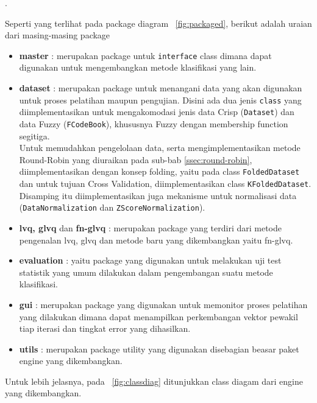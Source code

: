 .

\noindent Seperti yang terlihat pada package diagram \pic~\ref{fig:packaged},
berikut adalah uraian dari masing-masing package
\begin{itemize}
  \item \textbf{master} : merupakan package untuk \texttt{interface} class
  dimana dapat digunakan untuk mengembangkan metode klasifikasi yang lain.
  \item \textbf{dataset} : merupakan package untuk menangani data yang akan
  digunakan untuk proses pelatihan maupun pengujian. Disini ada dua jenis
  \texttt{class} yang diimplementasikan untuk mengakomodasi jenis data Crisp
  (\texttt{Dataset}) dan data Fuzzy (\texttt{FCodeBook}), khususnya Fuzzy dengan
  membership function segitiga. \\ 
  Untuk memudahkan pengelolaan data, serta mengimplementasikan metode
  Round-Robin yang diuraikan pada sub-bab \ref{ssec:round-robin},
  diimplementasikan dengan konsep folding, yaitu pada class
  \texttt{FoldedDataset} dan untuk tujuan Cross Validation, diimplementasikan
  class \texttt{KFoldedDataset}. Disamping itu diimplementasikan juga mekanisme
  untuk normalisasi data (\texttt{DataNormalization}  dan
  \texttt{ZScoreNormalization}).
  \item \textbf{lvq, glvq} dan \textbf{fn-glvq} : merupakan package yang
  terdiri dari metode pengenalan lvq, glvq dan metode baru yang dikembangkan
  yaitu fn-glvq.
  \item \textbf{evaluation} : yaitu package yang digunakan untuk melakukan uji
  test statistik yang umum dilakukan dalam pengembangan suatu metode klasifikasi.
  

  \item \textbf{gui} : merupakan package yang digunakan untuk memonitor proses
  pelatihan yang dilakukan dimana dapat menampilkan perkembangan vektor pewakil
  tiap iterasi dan tingkat error yang dihasilkan.
  \item \textbf{utils} : merupakan package utility yang digunakan disebagian
  beasar paket engine yang dikembangkan.
\end{itemize} 

Untuk lebih jelasnya, pada \pic~\ref{fig:classdiag} ditunjukkan class diagam
dari engine yang dikembangkan.


